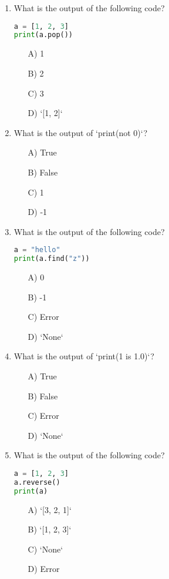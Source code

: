\documentclass[9pt]{article}
\begin{document}
\begin{multicols}{2}
\begin{enumerate}
\item What is the output of the following code?
\begin{lstlisting}[language=Python]
a = [1, 2, 3]
print(a.pop())
\end{lstlisting}
\begin{enumerate}
\item[A)] 1
\item[B)] 2
\item[C)] 3
\item[D)] `[1, 2]`
\end{enumerate}

\item What is the output of `print(not 0)`?
\begin{enumerate}
\item[A)] True
\item[B)] False
\item[C)] 1
\item[D)] -1
\end{enumerate}

\item What is the output of the following code?
\begin{lstlisting}[language=Python]
a = "hello"
print(a.find("z"))
\end{lstlisting}
\begin{enumerate}
\item[A)] 0
\item[B)] -1
\item[C)] Error
\item[D)] `None`
\end{enumerate}

\item What is the output of `print(1 is 1.0)`?
\begin{enumerate}
\item[A)] True
\item[B)] False
\item[C)] Error
\item[D)] `None`
\end{enumerate}

\item What is the output of the following code?
\begin{lstlisting}[language=Python]
a = [1, 2, 3]
a.reverse()
print(a)
\end{lstlisting}
\begin{enumerate}
\item[A)] `[3, 2, 1]`
\item[B)] `[1, 2, 3]`
\item[C)] `None`
\item[D)] Error
\end{enumerate}


\end{enumerate}
\end{multicols}
\end{document}
